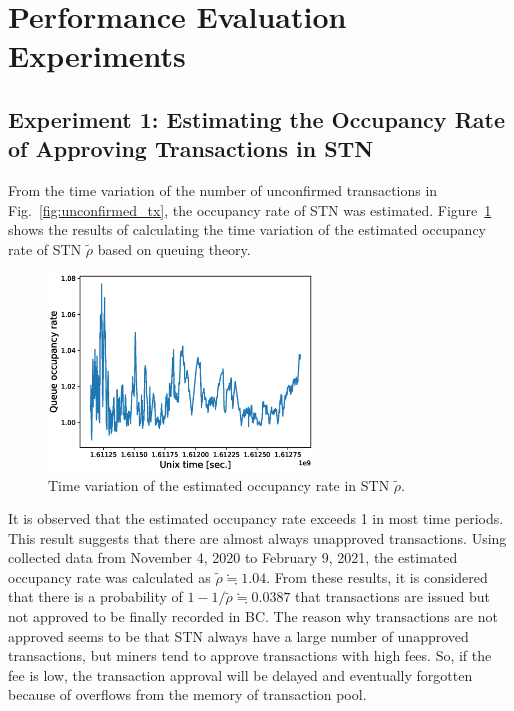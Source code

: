 \documentclass[graybox]{svmult}
\begin{document}
\section{Performance Evaluation Experiments}
\label{sec:experiments}

\subsection{Experiment 1: Estimating the Occupancy Rate of Approving Transactions in STN}
\label{sec:occupancyrate}

From the time variation of the number of unconfirmed transactions in Fig.~\ref{fig:unconfirmed_tx}, the occupancy rate of STN was estimated. 
Figure~\ref{fig:occupancyrate} shows the results of calculating the time variation of the estimated occupancy rate of STN $\tilde{\rho}$ based on queuing theory.
%
\begin{figure}[tb]
  \vspace{-35mm}
  \begin{center}
    \includegraphics[width=70mm]{bsv_stn-rho-queue_occupancy_rate.eps}
  \end{center}
  \vspace{35mm}
  \caption{Time variation of the estimated occupancy rate in STN $\tilde{\rho}$.}
  \label{fig:occupancyrate}
\end{figure}
%
It is observed that the estimated occupancy rate exceeds 1 in most time periods. 
This result suggests that there are almost always unapproved transactions. 
Using collected data from November 4, 2020 to February 9, 2021, the estimated occupancy rate was calculated as $\tilde{\rho} \fallingdotseq 1.04$. 
From these results, it is considered that there is a probability of $1 -1 / \tilde{\rho} \fallingdotseq 0.0387$ that transactions are issued but not approved to be finally recorded in BC. 
The reason why transactions are not approved seems to be that STN always have a large number of unapproved transactions, but miners tend to approve transactions with high fees. So, if the fee is low, the transaction approval will be delayed and eventually forgotten because of overflows from the memory of transaction pool. 
\end{document}
